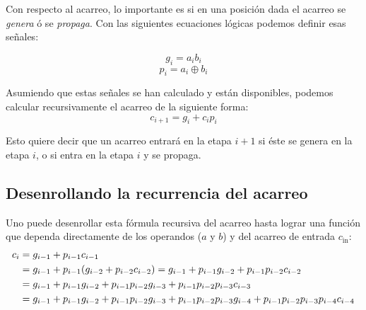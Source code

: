Con respecto al acarreo, lo importante es si en una posición dada el acarreo se \emph{genera} ó se \emph{propaga}. Con las siguientes ecuaciones lógicas podemos definir esas señales:
%

$$g_i=a_ib_i$$
$$p_i=a_i \oplus b_i$$


Asumiendo que estas señales se han calculado y están disponibles, podemos calcular recursivamente el acarreo de la siguiente forma:
\begin{equation}
c_{i+1}=g_i + c_i p_i
\end{equation}


\noindent Esto quiere decir que un acarreo entrará en la etapa \(i+1\) si éste se genera en la etapa \(i\), o si entra en la etapa \(i\) y se propaga.

\subsection{Desenrollando la recurrencia del acarreo}
Uno puede desenrollar esta fórmula recursiva del acarreo hasta lograr una función que dependa directamente de los operandos ($a$ y $b$) y del acarreo de entrada $c_{\text{in}}$:
\begin{equation}
\begin{align}
c_i &= g_{i-1} + p_{i-1}c_{i-1}\notag\\
&=g_{i-1}+p_{i-1}(g_{i-2}+p_{i-2}c_{i-2})=g_{i-1}+p_{i-1}g_{i-2}+p_{i-1}p_{i-2}c_{i-2}\notag\\
&=g_{i-1} + p_{i-1}g_{i-2}+p_{i-1}p_{i-2}g_{i-3}+p_{i-1}p_{i-2}p_{i-3}c_{i-3}\notag\\
&=g_{i-1} +p_{i-1}g_{i-2}+p_{i-1}p_{i-2}g_{i-3}+p_{i-1}p_{i-2}p_{i-3}g_{i-4}+p_{i-1}p_{i-2}p_{i-3}p_{i-4}c_{i-4}\label{gyp}	
\end{align}
\end{equation}

